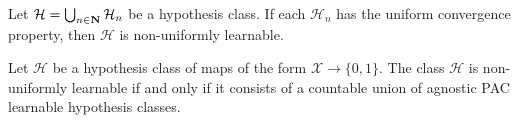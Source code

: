 \begin{lemma}
\label{lem:countable-unif-conv-prop--then-non-unif-learnable}
Let \(\mathcal{H} = \bigcup_{n \in \mathbf{N}} \mathcal{H}_n\) be a hypothesis class. If each \(\mathcal{H}_n\) has the
uniform convergence property, then \(\mathcal{H}\) is non-uniformly learnable.
\end{lemma}

\begin{theorem}
\label{thm:non-uniformly-learnable-iff-countable-union-pac}
Let \(\mathcal{H}\) be a hypothesis class of maps of the form
\(\mathcal{X} \to \{0, 1\}\). The class \(\mathcal{H}\) is non-uniformly learnable if and only if it
consists of a countable union of agnostic PAC learnable hypothesis classes.
\end{theorem}



